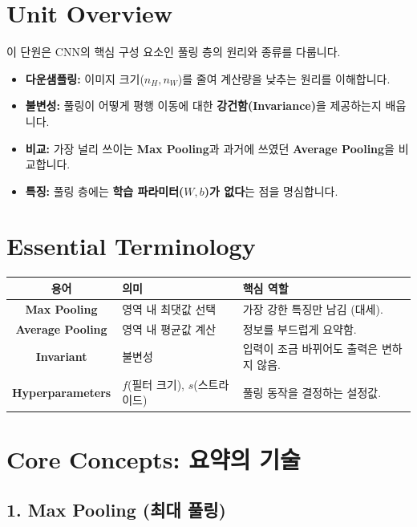 \documentclass[11pt,a4paper]{book}
\theoremstyle{definition}
\begin{document}
\section{Unit Overview}
\begin{summarybox}[title={핵심 목표}]
이 단원은 CNN의 핵심 구성 요소인 풀링 층의 원리와 종류를 다룹니다.
\begin{itemize}
    \item \textbf{다운샘플링:} 이미지 크기($n_H, n_W$)를 줄여 계산량을 낮추는 원리를 이해합니다.
    \item \textbf{불변성:} 풀링이 어떻게 평행 이동에 대한 \textbf{강건함(Invariance)}을 제공하는지 배웁니다.
    \item \textbf{비교:} 가장 널리 쓰이는 \textbf{Max Pooling}과 과거에 쓰였던 \textbf{Average Pooling}을 비교합니다.
    \item \textbf{특징:} 풀링 층에는 \textbf{학습 파라미터($W, b$)가 없다}는 점을 명심합니다.
\end{itemize}
\end{summarybox}

\section{Essential Terminology}
\begin{center}
\begin{tabular}{|c|l|l|}
\hline
\textbf{용어} & \textbf{의미} & \textbf{핵심 역할} \\ \hline
\textbf{Max Pooling} & 영역 내 최댓값 선택 & 가장 강한 특징만 남김 (대세). \\ \hline
\textbf{Average Pooling} & 영역 내 평균값 계산 & 정보를 부드럽게 요약함. \\ \hline
\textbf{Invariant} & 불변성 & 입력이 조금 바뀌어도 출력은 변하지 않음. \\ \hline
\textbf{Hyperparameters} & $f$(필터 크기), $s$(스트라이드) & 풀링 동작을 결정하는 설정값. \\ \hline
\end{tabular}
\end{center}

\section{Core Concepts: 요약의 기술}

\subsection{1. Max Pooling (최대 풀링)}
\end{document}
